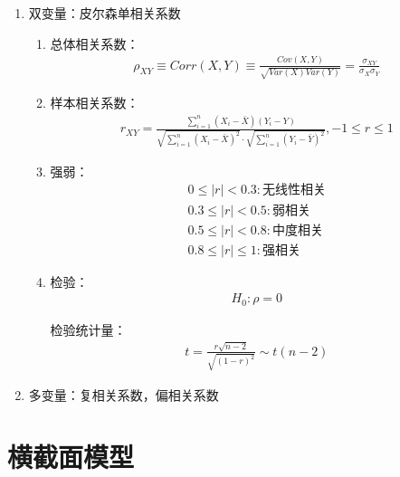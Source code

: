 \documentclass[12pt]{book}
\begin{document}
\begin{enumerate}[1.]
    \item 双变量：皮尔森单相关系数
          \begin{enumerate}[(1)]
              \item 总体相关系数：
                    \begin{gather*}
                        \rho_{XY}\equiv Corr\left(X,Y\right)\equiv\frac{Cov\left(X,Y\right)}{\sqrt{Var\left(X\right)Var\left(Y\right)}}
                        =\frac{\sigma_{XY}}{\sigma_X\sigma_Y}
                    \end{gather*}
              \item 样本相关系数：
                    \begin{gather*}
                        r_{XY} = \frac{\sum_{i=1}^{n}{ (X_i-\bar{X})(Y_i-Y)}}{\sqrt{\sum_{i=1}^{n}{(X_i-\bar{X})^2}}\cdot \sqrt{\sum_{i=1}^{n}{(Y_i-\bar{Y})^2}}  }, -1\leq r \leq 1
                    \end{gather*}
              \item 强弱：
                    \begin{align*}
                        0\le\left|r\right|<0.3:\text{无线性相关} \\
                        0.3\le\left|r\right|<0.5:\text{弱相关}   \\
                        0.5\le\left|r\right|<0.8:\text{中度相关} \\
                        0.8\le\left|r\right|\le1:\text{强相关}
                    \end{align*}
              \item 检验：
                    \begin{gather*}
                        H_0: \rho =0
                    \end{gather*}
                    \par 检验统计量：
                    \begin{gather*}
                        t = \frac{r\sqrt{n-2}}{\sqrt{(1-r)^2}} \sim t(n-2)
                    \end{gather*}
          \end{enumerate}
    \item 多变量：复相关系数，偏相关系数
\end{enumerate}


\section{横截面模型}
\end{document}
